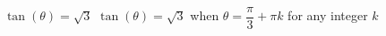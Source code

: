{$\tan(\theta) = \sqrt{3}$}
{$\tan(\theta) = \sqrt{3}$ when $\theta = \dfrac{\pi}{3} + \pi k$ for any integer $k$}
